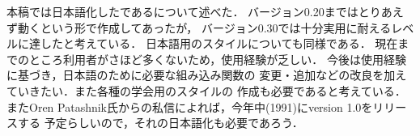 本稿では日本語化した\BibTeX である\JBibTeX について述べた．
バージョン0.20まではとりあえず動くという形で作成してあったが，
バージョン0.30では十分実用に耐えるレベルに達したと考えている．
日本語用のスタイルについても同様である．
現在までのところ利用者がさほど多くないため，使用経験が乏しい．
今後は使用経験に基づき，日本語のために必要な組み込み関数の
変更・追加などの改良を加えていきたい．また各種の学会用のスタイルの
作成も必要であると考えている．
またOren Patashnik氏からの私信によれば，今年中(1991)にversion 1.0をリリースする
予定らしいので，それの日本語化も必要であろう．




